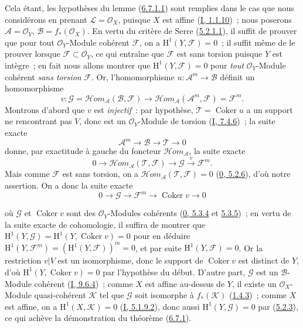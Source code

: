 Cela étant, les hypothèses du lemme
(\hyperref[II.6.7.1.1-fr]{6.7.1.1}) sont remplies dans le cas que nous
considérons en prenant $\mathcal{L}=\mathcal{O}_X$, puisque $X$ est affine
(\hyperref[I.1.1.10-fr]{I, 1.1.10})~; nous poserons
$\mathcal{A}=\mathcal{O}_Y$, $\mathcal{B}=f_*(\mathcal{O}_X)$. En vertu du
critère de Serre (\hyperref[II.5.2.1.1-fr]{5.2.1.1}), il suffit de prouver
que pour tout $\mathcal{O}_Y$-Module cohérent $\mathcal{F}$, on a
$\mathrm{H}^1(Y,\mathcal{F})=0$~; il suffit même de le prouver lorsque
$\mathcal{F}\subset\mathcal{O}_Y$, ce qui entraîne que $\mathcal{F}$ est
sans torsion puisque $Y$ est intègre~; en fait nous allons montrer que
$\mathrm{H}^1(Y,\mathcal{F})=0$ pour \emph{tout} $\mathcal{O}_Y$-Module
cohérent \emph{sans torsion} $\mathcal{F}$. Or, l'homomorphisme
$u:\mathcal{A}^m\to\mathcal{B}$ définit un homomorphisme
\[
v:\mathcal{G}
=\mathcal{H}om_{\mathcal{A}}(\mathcal{B},\mathcal{F})
\longrightarrow
\mathcal{H}om_{\mathcal{A}}(\mathcal{A}^m,\mathcal{F})
=\mathcal{F}^m.
\]
Montrons d'abord que $v$ est \emph{injectif}~: par hypothèse,
$\mathcal{T}=\operatorname{Coker}u$ a un support ne rencontrant pas $V$, donc
est un $\mathcal{O}_Y$-Module de torsion
(\hyperref[I.7.4.6-fr]{I, 7.4.6})~; la suite exacte
\[
\mathcal{A}^m\longrightarrow\mathcal{B}\longrightarrow\mathcal{T}
\longrightarrow0
\]
donne, par exactitude à gauche du foncteur
$\mathcal{H}om_{\mathcal{A}}$, la suite exacte
\[
0\longrightarrow
\mathcal{H}om_{\mathcal{A}}(\mathcal{T},\mathcal{F})
\longrightarrow\mathcal{G}\xrightarrow{v}\mathcal{F}^m.
\]
Mais comme $\mathcal{F}$ est sans torsion, on a
$\mathcal{H}om_{\mathcal{A}}(\mathcal{T},\mathcal{F})=0$
(\hyperref[0.5.2.6-fr]{0, 5.2.6}), d'où notre assertion. On a donc la suite
exacte
\[
0\longrightarrow\mathcal{G}\longrightarrow\mathcal{F}^m
\longrightarrow\operatorname{Coker}v\longrightarrow0
\]


où $\mathcal{G}$ et $\operatorname{Coker}v$ sont des
$\mathcal{O}_Y$-Modules cohérents
(\hyperref[0.5.3.4-fr]{0, 5.3.4} et
\hyperref[0.5.3.5-fr]{5.3.5})~; en vertu de la suite exacte de cohomologie,
il suffira de montrer que
$\mathrm{H}^1(Y,\mathcal{G})
=\mathrm{H}^1(Y,\operatorname{Coker}v)=0$ pour en déduire
$\mathrm{H}^1(Y,\mathcal{F}^m)
=(\mathrm{H}^1(Y,\mathcal{F}))^m=0$, et par suite
$\mathrm{H}^1(Y,\mathcal{F})=0$. Or la restriction $v|V$ est un isomorphisme,
donc le support de $\operatorname{Coker}v$ est distinct de $Y$, d'où
$\mathrm{H}^1(Y,\operatorname{Coker}v)=0$ par l'hypothèse du début. D'autre
part, $\mathcal{G}$ est un $\mathcal{B}$-Module cohérent
(\hyperref[I.9.6.4-fr]{I, 9.6.4})~; comme $X$ est affine au-dessus de $Y$, il
existe un $\mathcal{O}_X$-Module quasi-cohérent $\mathcal{K}$ tel que
$\mathcal{G}$ soit isomorphe à $f_*(\mathcal{K})$
(\hyperref[II.1.4.3-fr]{1.4.3})~; comme $X$ est affine, on a
$\mathrm{H}^1(X,\mathcal{K})=0$
(\hyperref[I.5.1.9.2-fr]{I, 5.1.9.2}), donc aussi
$\mathrm{H}^1(Y,\mathcal{G})=0$ par
(\hyperref[II.5.2.3-fr]{5.2.3}), ce qui achève la démonstration du théorème
(\hyperref[II.6.7.1-fr]{6.7.1}).

